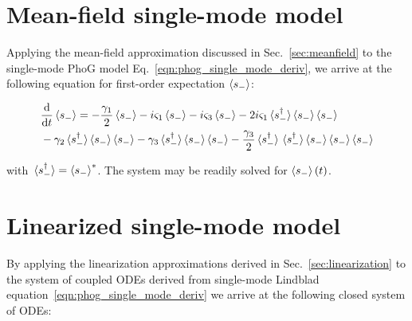 \FloatBarrier
\section{Mean-field single-mode model}\label{appendix:single_mode_mean_field}
Applying the mean-field approximation discussed in Sec.~\ref{sec:meanfield} to the single-mode PhoG model Eq.~\ref{eqn:phog_single_mode_deriv}, we arrive at the following equation for first-order expectation $\ev{s_-}$:

\begin{align}
&\ddt \ev{s_-} = - \frac{\gamma_1}{2} \ev{s_-} - i \varsigma_1 \ev{s_-} - i \varsigma_3 \ev{s_-} - 2 i \varsigma_1 \ev*{s_-^\dagger} \ev{s_-} \ev{s_-}  \notag \\
%
&- \gamma_2 \ev*{s_-^\dagger} \ev{s_-} \ev{s_-} - \gamma_3 \ev*{s_-^\dagger} \ev{s_-} \ev{s_-} - \frac{\gamma_3}{2} \ev*{s_-^\dagger} \ev*{s_-^\dagger} \ev{s_-} \ev{s_-} \ev{s_-}
\end{align}

\noindent with $\ev*{s_-^\dagger} = \ev{s_-}^*$. The system may be readily solved for $\ev{s_-}\left(t\right)$.

\section{Linearized single-mode model}\label{appendix:single_mode_linear}
By applying the linearization approximations derived in Sec.~\ref{sec:linearization} to the system of coupled ODEs derived from single-mode Lindblad equation~\ref{eqn:phog_single_mode_deriv} we arrive at the following closed system of ODEs:


